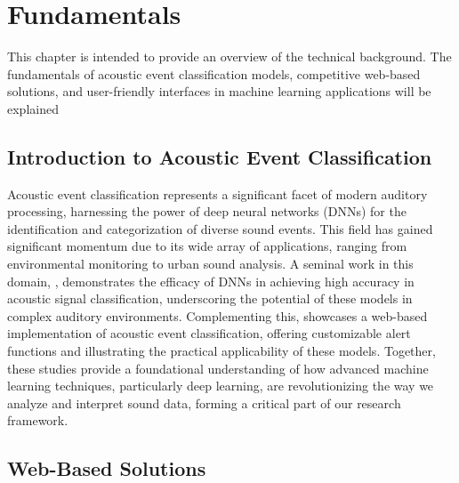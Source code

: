 \chapter{Fundamentals}

This chapter is intended to provide an overview of the technical background. The fundamentals of acoustic event classification models, competitive web-based solutions, and user-friendly interfaces in machine learning applications will be explained

\section{Introduction to Acoustic Event Classification}

Acoustic event classification represents a significant facet of modern auditory processing, harnessing the power of deep neural networks (DNNs) for the identification and categorization of diverse sound events. This field has gained significant momentum due to its wide array of applications, ranging from environmental monitoring to urban sound analysis. A seminal work in this domain, \cite{sampath2020low}, demonstrates the efficacy of DNNs in achieving high accuracy in acoustic signal classification, underscoring the potential of these models in complex auditory environments. Complementing this, \cite{sampath2019realtime} showcases a web-based implementation of acoustic event classification, offering customizable alert functions and illustrating the practical applicability of these models. Together, these studies provide a foundational understanding of how advanced machine learning techniques, particularly deep learning, are revolutionizing the way we analyze and interpret sound data, forming a critical part of our research framework.

\section{Web-Based Solutions}

